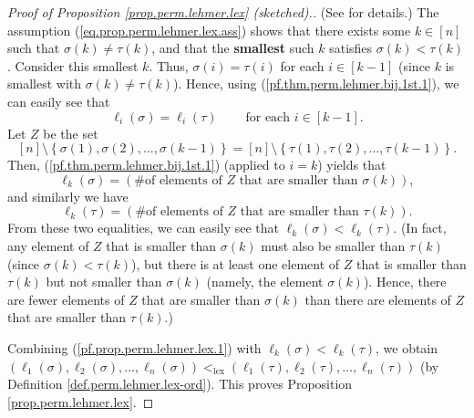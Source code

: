 \begin{proof}
[Proof of Proposition \ref{prop.perm.lehmer.lex} (sketched).](See
\cite[solution to Exercise 5.18, proof of Proposition 5.50]{detnotes} for
details.) The assumption (\ref{eq.prop.perm.lehmer.lex.ass}) shows that there
exists some $k\in\left[  n\right]  $ such that $\sigma\left(  k\right)
\neq\tau\left(  k\right)  $, and that the \textbf{smallest} such $k$ satisfies
$\sigma\left(  k\right)  <\tau\left(  k\right)  $. Consider this smallest $k$.
Thus, $\sigma\left(  i\right)  =\tau\left(  i\right)  $ for each $i\in\left[
k-1\right]  $ (since $k$ is smallest with $\sigma\left(  k\right)  \neq
\tau\left(  k\right)  $). Hence, using (\ref{pf.thm.perm.lehmer.bij.1st.1}),
we can easily see that%
\begin{equation}
\ell_{i}\left(  \sigma\right)  =\ell_{i}\left(  \tau\right)
\ \ \ \ \ \ \ \ \ \ \text{for each }i\in\left[  k-1\right]  .
\label{pf.prop.perm.lehmer.lex.1}%
\end{equation}
Let $Z$ be the set%
\[
\left[  n\right]  \setminus\left\{  \sigma\left(  1\right)  ,\sigma\left(
2\right)  ,\ldots,\sigma\left(  k-1\right)  \right\}  =\left[  n\right]
\setminus\left\{  \tau\left(  1\right)  ,\tau\left(  2\right)  ,\ldots
,\tau\left(  k-1\right)  \right\}  .
\]
Then, (\ref{pf.thm.perm.lehmer.bij.1st.1}) (applied to $i=k$) yields that
\[
\ell_{k}\left(  \sigma\right)  =\left(  \text{\# of elements of }Z\text{ that
are smaller than }\sigma\left(  k\right)  \right)  ,
\]
and similarly we have%
\[
\ell_{k}\left(  \tau\right)  =\left(  \text{\# of elements of }Z\text{ that
are smaller than }\tau\left(  k\right)  \right)  .
\]
From these two equalities, we can easily see that $\ell_{k}\left(
\sigma\right)  <\ell_{k}\left(  \tau\right)  $. (In fact, any element of $Z$
that is smaller than $\sigma\left(  k\right)  $ must also be smaller than
$\tau\left(  k\right)  $ (since $\sigma\left(  k\right)  <\tau\left(
k\right)  $), but there is at least one element of $Z$ that is smaller than
$\tau\left(  k\right)  $ but not smaller than $\sigma\left(  k\right)  $
(namely, the element $\sigma\left(  k\right)  $). Hence, there are fewer
elements of $Z$ that are smaller than $\sigma\left(  k\right)  $ than there
are elements of $Z$ that are smaller than $\tau\left(  k\right)  $.)

Combining (\ref{pf.prop.perm.lehmer.lex.1}) with $\ell_{k}\left(
\sigma\right)  <\ell_{k}\left(  \tau\right)  $, we obtain $\left(  \ell
_{1}\left(  \sigma\right)  ,\ell_{2}\left(  \sigma\right)  ,\ldots,\ell
_{n}\left(  \sigma\right)  \right)  <_{\operatorname*{lex}}\left(  \ell
_{1}\left(  \tau\right)  ,\ell_{2}\left(  \tau\right)  ,\ldots,\ell_{n}\left(
\tau\right)  \right)  $ (by Definition \ref{def.perm.lehmer.lex-ord}). This
proves Proposition \ref{prop.perm.lehmer.lex}.
\end{proof}

